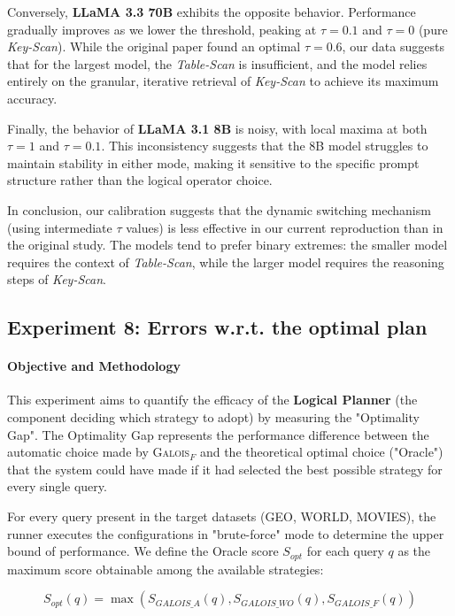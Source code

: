 Conversely, \textbf{LLaMA 3.3 70B} exhibits the opposite behavior. Performance gradually improves as we lower the threshold, peaking at $\tau=0.1$ and $\tau=0$ (pure \textit{Key-Scan}). While the original paper found an optimal $\tau=0.6$, our data suggests that for the largest model, the \textit{Table-Scan} is insufficient, and the model relies entirely on the granular, iterative retrieval of \textit{Key-Scan} to achieve its maximum accuracy.

Finally, the behavior of \textbf{LLaMA 3.1 8B} is noisy, with local maxima at both $\tau=1$ and $\tau=0.1$. This inconsistency suggests that the 8B model struggles to maintain stability in either mode, making it sensitive to the specific prompt structure rather than the logical operator choice.

In conclusion, our calibration suggests that the dynamic switching mechanism (using intermediate $\tau$ values) is less effective in our current reproduction than in the original study. The models tend to prefer binary extremes: the smaller model requires the context of \textit{Table-Scan}, while the larger model requires the reasoning steps of \textit{Key-Scan}.

\subsection{Experiment 8: Errors w.r.t. the optimal plan}

\paragraph{Objective and Methodology}
This experiment aims to quantify the efficacy of the \textbf{Logical Planner} (the component deciding which strategy to adopt) by measuring the "Optimality Gap". The Optimality Gap represents the performance difference between the automatic choice made by \textsc{Galois}$_F$ and the theoretical optimal choice ("Oracle") that the system could have made if it had selected the best possible strategy for every single query.

For every query present in the target datasets (GEO, WORLD, MOVIES), the runner executes the configurations in "brute-force" mode to determine the upper bound of performance. We define the Oracle score $S_{opt}$ for each query $q$ as the maximum score obtainable among the available strategies:

\[
S_{opt}(q) = \max(S_{GALOIS\_A}(q), S_{GALOIS\_WO}(q), S_{GALOIS\_F}(q))
\]

